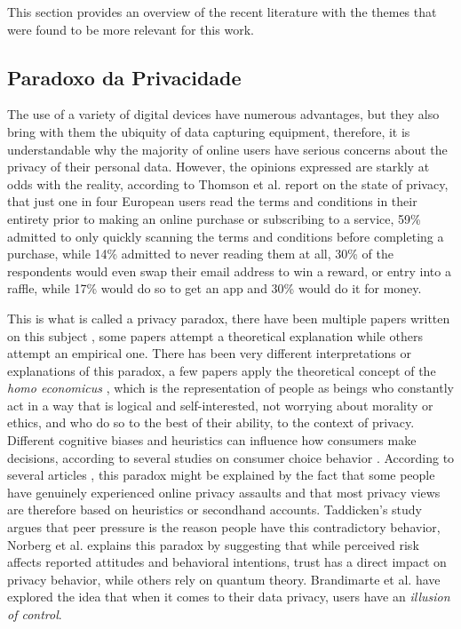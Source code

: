 \documentclass[conference]{IEEEtran}
\begin{document}
\par
This section provides an overview of the recent literature with the themes
that were found to be more relevant for this work.

\subsection{Paradoxo da Privacidade}

The use of a variety of digital devices have numerous advantages, but they
also bring with them the ubiquity of data capturing equipment, therefore,
it is understandable why the majority of online users have serious concerns
about the privacy of their personal data. However, the opinions expressed
are starkly at odds with the reality, according to Thomson et al. \cite{DarrenState}
report on the state of privacy, that just one in four European users read
the terms and conditions in their entirety prior to making an online purchase
or subscribing to a service, 59\% admitted to only quickly scanning the
terms and conditions before completing a purchase, while 14\% admitted to
never reading them at all, 30\% of the respondents would even swap their
email address to win a reward, or entry into a raffle, while 17\% would do
so to get an app and 30\% would do it for money.

This is what is called a privacy paradox, there have been multiple papers
written on this subject \cite{solove2021myth, WilliamsPrivacy, lee2021investigating, goad2021privacy, gerber2018explaining},
some papers attempt a theoretical explanation while others attempt an empirical
one. There has been very different interpretations or explanations of this
paradox, a few papers \cite{wilson2012unpacking, warshaw2015can, lee2015privacy}
apply the theoretical concept of the \textit{homo economicus} \cite{zak2008moral},
which is the representation of people as beings who constantly act in a
way that is logical and self-interested, not worrying about morality or
ethics, and who do so to the best of their ability, to the context of privacy.
Different cognitive biases and heuristics can influence how consumers make
decisions, according to several studies on consumer choice behavior \cite{acquisti2007can, knijnenburg2013dimensionality, wakefield2013influence, flender2012type}.
According to several articles \cite{dienlin2015privacy, baek2014solving},
this paradox might be explained by the fact that some people have genuinely
experienced online privacy assaults and that most privacy views are therefore
based on heuristics or secondhand accounts. Taddicken's study \cite{taddicken2014privacy}
argues that peer pressure is the reason people have this contradictory behavior,
Norberg et al. \cite{norberg2007privacy} explains this paradox by suggesting
that while perceived risk affects reported attitudes and behavioral intentions,
trust has a direct impact on privacy behavior, while others \cite{flender2012type, kokolakis2017privacy}
rely on quantum theory. Brandimarte et al. \cite{brandimarte2013misplaced}
have explored the idea that when it comes to their data privacy, users have
an \textit{illusion of control}.
\end{document}
